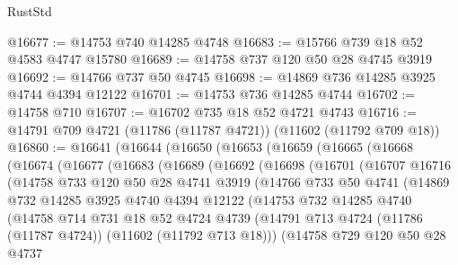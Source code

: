 \begin{lexlean}{RustStd}
\begin{coremodule}
@16677 := @14753 @740 @14285 @4748
@16683 := @15766 @739 @18 @52 @4583 @4747 @15780
@16689 := @14758 @737 @120 @50 @28 @4745 @3919
@16692 := @14766 @737 @50 @4745
@16698 := @14869 @736 @14285 @3925 @4744 @4394 @12122
@16701 := @14753 @736 @14285 @4744
@16702 := @14758 @710
@16707 := @16702 @735 @18 @52 @4721 @4743
@16716 := @14791 @709 @4721 (@11786 (@11787 @4721)) (@11602 (@11792 @709 @18))
@16860 := @16641
    (@16644
      (@16650
        (@16653
          (@16659
            (@16665
              (@16668
                (@16674
                  (@16677
                    (@16683
                      (@16689
                        (@16692
                          (@16698
                            (@16701
                              (@16707
                                @16716
                                (@14758
                                  @733
                                  @120
                                  @50
                                  @28
                                  @4741
                                  @3919
                                  (@14766
                                    @733
                                    @50
                                    @4741
                                    (@14869
                                      @732
                                      @14285
                                      @3925
                                      @4740
                                      @4394
                                      @12122
                                      (@14753
                                        @732
                                        @14285
                                        @4740
                                        (@14758
                                          @714
                                          @731
                                          @18
                                          @52
                                          @4724
                                          @4739
                                          (@14791
                                            @713
                                            @4724
                                            (@11786 (@11787 @4724))
                                            (@11602 (@11792 @713 @18)))
                                          (@14758
                                            @729
                                            @120
                                            @50
                                            @28
                                            @4737

\end{coremodule}
\end{lexlean}
